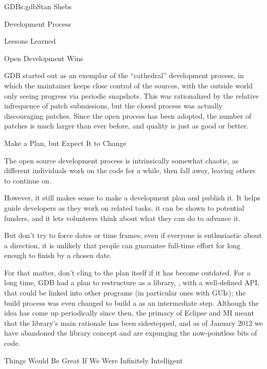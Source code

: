\begin{aosachapter}{GDB}{s:gdb}{Stan Shebs}
\begin{aosasect1}{Development Process}
\end{aosasect1}

\begin{aosasect1}{Lessons Learned}

\begin{aosasect2}{Open Development Wins}

GDB started out as an exemplar of the ``cathedral'' development
process, in which the maintainer keeps close control of the sources,
with the outside world only seeing progress via periodic snapshots.
This was rationalized by the relative infrequence of patch submissions,  
but the closed process was actually discouraging patches. Since
the open process has been adopted, the number of patches is much
larger than ever before, and quality is just as good or better.

\end{aosasect2}

\begin{aosasect2}{Make a Plan, but Expect It to Change}

The open source development process is intrinsically somewhat chaotic,
as different individuals work on the code for a while, then fall away,
leaving others to continue on.

However, it still makes sense to make a development plan and publish
it.  It helps guide developers as they work on related tasks, it can
be shown to potential funders, and it lets volunteers think about what they can do
to advance it.

But don't try to force dates or time frames; even if everyone is
enthusiastic about a direction, it is unlikely that people can
guarantee full-time effort for long enough to finish by a chosen date.

For that matter, don't cling to the plan itself if it has become
outdated.  For a long time, GDB had a plan to restructure as a library,
, with a well-defined API, that could be linked into other
programs (in particular ones with GUIs); the build process was
even changed to build a  as an intermediate step.
Although the idea has come up periodically since then, the primacy of
Eclipse and MI meant that the library's main rationale has been
sidestepped, and as of January 2012 we have abandoned the library
concept and are expunging the now-pointless bits of code.

\end{aosasect2}

\begin{aosasect2}{Things Would Be Great If We Were Infinitely Intelligent}


\end{aosasect2}
\end{aosasect1}
\end{aosachapter}

